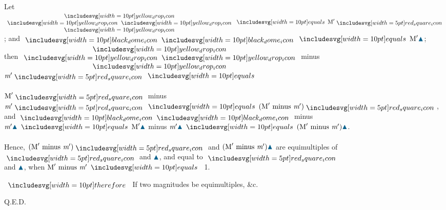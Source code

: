 \documentclass[12pt,preview]{standalone}
\begin{document}
\begin{minipage}{\textwidth}
    \begin{center}
        Let $\hspace{-1ex}\begin{array}{c} \yellowdrop \\ \yellowdrop \yellowdrop \\ \yellowdrop \end{array}\hspace{-1ex} \bequals \text{M}' \smallredsquare$; and $\blackdome \blackdome \bequals \text{M}' {\color{cblue}\blacktriangle}$;
        \hfill\\
        then $\hspace{-1ex}\begin{array}{c} \yellowdrop \\ \yellowdrop \yellowdrop \\ \yellowdrop \end{array}\hspace{-1ex}$ minus $\textit{m}' \smallredsquare \bequals$\\
        \hfill\\
        $\text{M}' \smallredsquare$ minus $\textit{m}' \smallredsquare \bequals (\text{M}' \text{ minus } \textit{m}') \smallredsquare$,\\
        and $\blackdome \blackdome$ minus $\textit{m}'{\color{cblue}\blacktriangle} \bequals \text{M}'{\color{cblue}\blacktriangle}$ minus $\textit{m}'{\color{cblue}\blacktriangle} \bequals (\text{M}' \text{ minus } \textit{m}'){\color{cblue}\blacktriangle}$.\\
        \hfill\\
        Hence, $(\text{M}' \text{ minus } \textit{m}')\smallredsquare$ and $(\text{M}' \text{ minus } \textit{m}') {\color{cblue}\blacktriangle}$ are equimultiples of $\smallredsquare$ and ${\color{cblue}\blacktriangle}$, and equal to $\smallredsquare$\\
        and ${\color{cblue}\blacktriangle}$, when $\text{M}' \text{ minus } \textit{m}' \bequals$ 1.\\
    \end{center}

    \hfill

    $\btherefore$ If two magnitudes be equimultiples, \&c.

    \hfill

    \hfill Q.E.D.
\end{minipage}%
\end{document}
